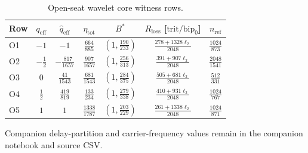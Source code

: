 \begin{table}[H]
\centering
\caption{Open-seat wavelet core witness rows.}
\label{tab:manual-open-seat-wavelet-core}
\begin{threeparttable}
\small
\begin{tabular}{@{}lcccccc@{}}
\toprule
Row & $q_{\mathrm{eff}}$ & $\widehat q_{\mathrm{eff}}$ & $\eta_{\mathrm{tot}}$ & $B^*$ & $R_{\mathrm{loss}}$ [\(\mathrm{trit}/\mathrm{bip}_0\)] & $n_{\mathrm{ref}}$ \\
\midrule
O1 & $-1$ & $-1$ & $\frac{664}{885}$ & $(1,\frac{190}{233})$ & $\frac{278+1328\ell_2}{2048}$ & $\frac{1024}{873}$ \\
O2 & $-\frac12$ & $-\frac{817}{1657}$ & $\frac{907}{1657}$ & $(1,\frac{256}{313})$ & $\frac{391+907\ell_2}{2048}$ & $\frac{2048}{1541}$ \\
O3 & $0$ & $\frac{41}{1543}$ & $\frac{681}{1543}$ & $(1,\frac{284}{375})$ & $\frac{505+681\ell_2}{2048}$ & $\frac{512}{331}$ \\
O4 & $\frac12$ & $\frac{419}{819}$ & $\frac{133}{234}$ & $(1,\frac{279}{338})$ & $\frac{410+931\ell_2}{2048}$ & $\frac{1024}{767}$ \\
O5 & $1$ & $1$ & $\frac{1338}{1787}$ & $(1,\frac{203}{229})$ & $\frac{261+1338\ell_2}{2048}$ & $\frac{1024}{871}$ \\
\bottomrule
\end{tabular}
\end{threeparttable}
\end{table}

Companion delay-partition and carrier-frequency values remain in the companion notebook and source CSV.


